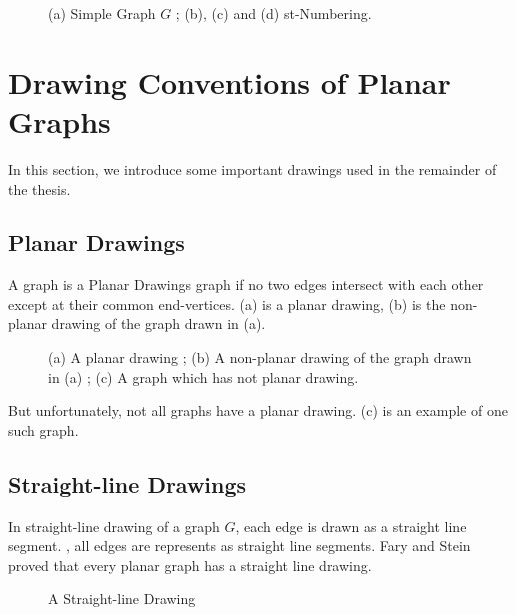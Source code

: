 \begin{figure}[!tb]
  \centering
\resizebox{100mm}{!}{}
\caption{(a) Simple Graph $G$ ; (b), (c) and (d) st-Numbering.}
\label{fig:st}
\end{figure}


\section{Drawing Conventions of Planar Graphs}
\label{dcpg}

In this section, we introduce some important drawings used in the remainder of the thesis.

\subsection{Planar Drawings}

A graph is a Planar Drawings graph if no two edges intersect with each other except at their common end-vertices.  (a) is a planar drawing, (b) is the non-planar drawing of the graph drawn in (a).

\begin{figure}[!tb]
\centering
\resizebox{150mm}{!}{}
\caption{(a) A planar drawing ; (b) A non-planar drawing of the graph drawn in (a) ; (c) A graph which has not planar drawing.}
\label{fig:planar_drawings}
\end{figure}

But unfortunately, not all graphs have a planar drawing.  (c) is an example of one such graph.


\subsection{Straight-line Drawings}

In straight-line drawing of a graph $G$, each edge is drawn as a straight line segment. , all edges are represents as straight line segments. Fary \cite{fary} and Stein \cite{stein} proved that every planar graph has a straight line drawing.

\begin{figure}[!tb]
\centering
\resizebox{20mm}{!}{}
\caption{A Straight-line Drawing}
\label{fig:straight_line_drawing}
\end{figure}




